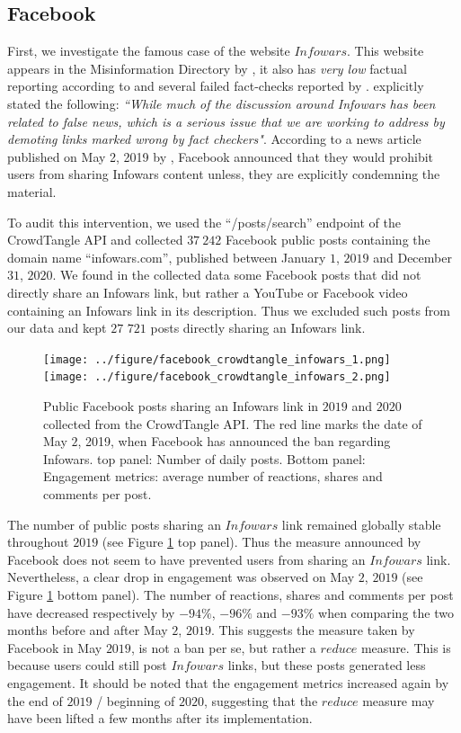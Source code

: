 \documentclass[Afour,sageh,times]{sagej}
\begin{document}
\subsection{Facebook} \label{reduce_fb}

First, we investigate the famous case of the website $Infowars$. This website appears in the Misinformation Directory by \cite{misinformationdirectory}, it also has {\it very low}  factual reporting according to \cite{MBFCinfowars} and several failed fact-checks reported by \cite{openfeedbackinfowars}.  \cite{facebookinfowars} explicitly stated the following: {\it ``While much of the discussion around Infowars has been related to false news, which is a serious issue that we are working to address by demoting links marked wrong by fact checkers"}. According to a news article published on May 2, 2019 by \cite{wiredalexjones}, Facebook announced that they would prohibit users from sharing Infowars content unless, they are explicitly condemning the material.

To audit this intervention, we used the ``/posts/search'' endpoint of the CrowdTangle API and  collected $37~242$ Facebook public posts containing the domain name ``infowars.com'', published between January $1$, $2019$ and December $31$, $2020$. We found in the collected data some Facebook posts that did not directly share an Infowars link, but rather a YouTube or Facebook video containing an Infowars link in its description. Thus we excluded such posts from our data and kept $27$ $721$ posts directly sharing an Infowars link.

\begin{figure}[h]
\hspace{-2em}
		\texttt{[image: ../figure/facebook\_crowdtangle\_infowars\_1.png]}
		\texttt{[image: ../figure/facebook\_crowdtangle\_infowars\_2.png]} 
	\caption{Public Facebook posts sharing an Infowars link in $2019$ and $2020$ collected from the CrowdTangle API. The red line marks the date of May $2$, 2019, when Facebook has announced the ban regarding Infowars. top panel: Number of daily posts. Bottom panel: Engagement metrics: average number of reactions, shares and comments per post. }
	\label{infowars1}
\end{figure}

The number of public posts sharing an $Infowars$ link remained globally stable throughout $2019$ (see Figure \ref{infowars1} top panel). 
Thus the measure announced by Facebook does not seem to have prevented users from sharing an $Infowars$ link. Nevertheless, a clear drop in engagement was observed on May $2$, $2019$ (see Figure \ref{infowars1} bottom panel). 
The number of reactions, shares and comments per post have decreased respectively  by $-94\%$,  $-96\%$ and $-93\%$  when comparing the two months before and after May $2$, $2019$. This suggests the measure taken by Facebook in May $2019$, is not a ban per se, but rather a $reduce$ measure. This is because users could still post $Infowars$ links, but these posts generated less engagement. It should be noted that the engagement metrics increased again by the end of $2019$ / beginning of $2020$, suggesting that the $reduce$ measure may have been lifted a few months after its implementation.
\end{document}
